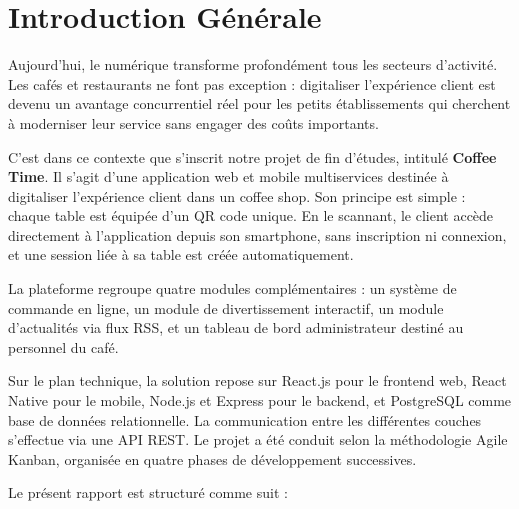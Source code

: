 \chapter*{Introduction Générale}

Aujourd'hui, le numérique transforme profondément tous les secteurs d'activité. Les cafés
et restaurants ne font pas exception : digitaliser l'expérience client est devenu un avantage
concurrentiel réel pour les petits établissements qui cherchent à moderniser leur service
sans engager des coûts importants.

C'est dans ce contexte que s'inscrit notre projet de fin d'études, intitulé \textbf{Coffee Time}.
Il s'agit d'une application web et mobile multiservices destinée à digitaliser l'expérience
client dans un coffee shop. Son principe est simple : chaque table est équipée d'un QR code
unique. En le scannant, le client accède directement à l'application depuis son smartphone,
sans inscription ni connexion, et une session liée à sa table est créée automatiquement.

La plateforme regroupe quatre modules complémentaires : un système de commande en
ligne, un module de divertissement interactif, un module d'actualités via flux RSS, et un
tableau de bord administrateur destiné au personnel du café.

Sur le plan technique, la solution repose sur React.js pour le frontend web, React Native
pour le mobile, Node.js et Express pour le backend, et PostgreSQL comme base de données
relationnelle. La communication entre les différentes couches s'effectue via une API REST.
Le projet a été conduit selon la méthodologie Agile Kanban, organisée en quatre phases de
développement successives.

Le présent rapport est structuré comme suit :

